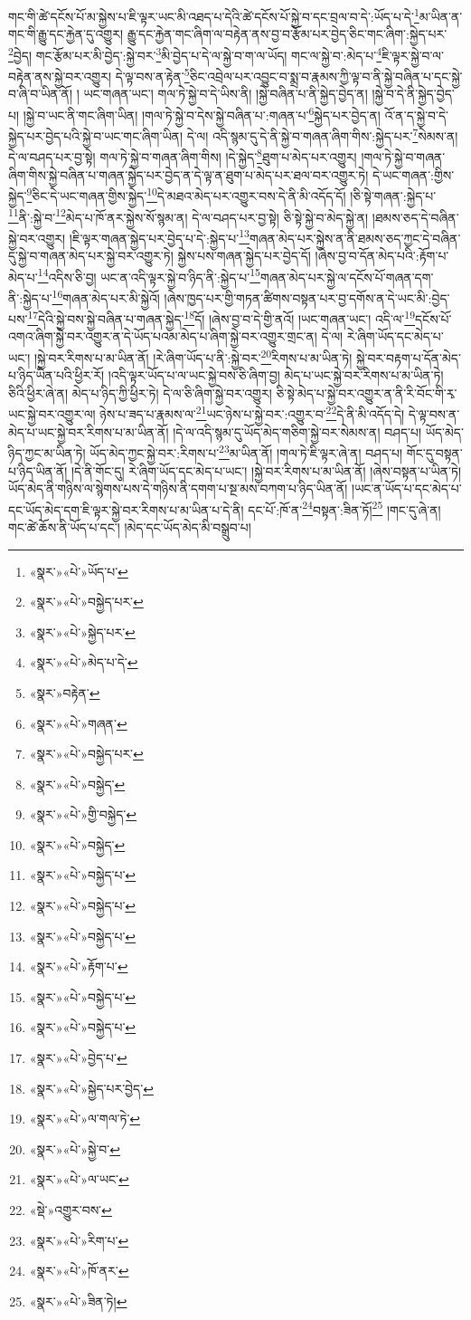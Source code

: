 གང་གི་ཚེ་དངོས་པོ་མ་སྐྱེས་པ་ཇི་ལྟར་ཡང་མི་འཐད་པ་དེའི་ཚེ་དངོས་པོ་སྐྱེ་བ་དང་བྲལ་བ་དེ་:ཡོད་པ་དེ་\footnote{«སྣར་»«པེ་»ཡོད་པ་}མ་ཡིན་ན་གང་གི་རྒྱུ་དང་རྐྱེན་དུ་འགྱུར། རྒྱུ་དང་རྐྱེན་གང་ཞིག་ལ་བརྟེན་ནས་བྱ་བ་རྩོམ་པར་བྱེད་ཅིང་གང་ཞིག་:སྐྱེད་པར་\footnote{«སྣར་»«པེ་»བསྐྱེད་པར་}བྱེད། གང་རྩོམ་པར་མི་བྱེད་:སྐྱེ་བར་\footnote{«སྣར་»«པེ་»སྐྱེད་པར་}མི་བྱེད་པ་དེ་ལ་སྐྱེ་བ་ག་ལ་ཡོད། གང་ལ་སྐྱེ་བ་:མེད་པ་\footnote{«སྣར་»«པེ་»མེད་པ་དེ་}ཇི་ལྟར་སྐྱེ་བ་ལ་བརྟེན་ནས་སྐྱེ་བར་འགྱུར། དེ་ལྟ་བས་ན་རྟེན་\footnote{«སྣར་»བརྟེན་}ཅིང་འབྲེལ་པར་འབྱུང་བ་སྨྲ་བ་རྣམས་ཀྱི་ལྟ་བ་ནི་སྐྱེ་བཞིན་པ་དང་སྐྱེ་བ་ཞི་བ་ཡིན་ནོ། །
ཡང་གཞན་ཡང་། གལ་ཏེ་སྐྱེ་བ་དེ་ཡིས་ནི། །སྐྱེ་བཞིན་པ་ནི་སྐྱེད་བྱེད་ན། །སྐྱེ་བ་དེ་ནི་སྐྱེད་བྱེད་པ། །སྐྱེ་བ་ཡང་ནི་གང་ཞིག་ཡིན། །གལ་ཏེ་སྐྱེ་བ་དེས་སྐྱེ་བཞིན་པ་:གཞན་པ་\footnote{«སྣར་»«པེ་»གཞན་}སྐྱེད་པར་བྱེད་ན། འོ་ན་ད་སྐྱེ་བ་དེ་སྐྱེད་པར་བྱེད་པའི་སྐྱེ་བ་ཡང་གང་ཞིག་ཡིན། དེ་ལ། འདི་སྙམ་དུ་དེ་ནི་སྐྱེ་བ་གཞན་ཞིག་གིས་:སྐྱེད་པར་\footnote{«སྣར་»«པེ་»བསྐྱེད་པར་}སེམས་ན། དེ་ལ་བཤད་པར་བྱ་སྟེ། གལ་ཏེ་སྐྱེ་བ་གཞན་ཞིག་གིས། །དེ་སྐྱེད་\footnote{«སྣར་»«པེ་»བསྐྱེད་}ཐུག་པ་མེད་པར་འགྱུར། །གལ་ཏེ་སྐྱེ་བ་གཞན་ཞིག་གིས་སྐྱེ་བཞིན་པ་གཞན་སྐྱེད་པར་བྱེད་ན་དེ་ལྟ་ན་ཐུག་པ་མེད་པར་ཐལ་བར་འགྱུར་ཏེ། དེ་ཡང་གཞན་:གྱིས་སྐྱེད་\footnote{«སྣར་»«པེ་»གྱི་བསྐྱེད་}ཅིང་དེ་ཡང་གཞན་གྱིས་སྐྱེད་\footnote{«སྣར་»«པེ་»བསྐྱེད་}དེ་མཐའ་མེད་པར་འགྱུར་བས་དེ་ནི་མི་འདོད་དོ། །ཅི་སྟེ་གཞན་:སྐྱེད་པ་\footnote{«སྣར་»«པེ་»བསྐྱེད་པ་}ནི་:སྐྱེ་བ་\footnote{«སྣར་»«པེ་»བསྐྱེད་པ་}མེད་པ་ཁོ་ནར་སྐྱེས་སོ་སྙམ་ན། དེ་ལ་བཤད་པར་བྱ་སྟེ། ཅི་སྟེ་སྐྱེ་བ་མེད་སྐྱེ་ན། །ཐམས་ཅད་དེ་བཞིན་སྐྱེ་བར་འགྱུར། །ཇི་ལྟར་གཞན་སྐྱེད་པར་བྱེད་པ་དེ་:སྐྱེད་པ་\footnote{«སྣར་»«པེ་»བསྐྱེད་པ་}གཞན་མེད་པར་སྐྱེས་ན་ནི་ཐམས་ཅད་ཀྱང་དེ་བཞིན་དུ་སྐྱེ་བ་གཞན་མེད་པར་སྐྱེ་བར་འགྱུར་ཏེ། སྐྱེས་པས་གཞན་སྐྱེད་པར་བྱེད་དོ། །ཞེས་བྱ་བ་དོན་མེད་པའི་:རྟོག་པ་མེད་པ་\footnote{«སྣར་»«པེ་»རྟོག་པ་}འདིས་ཅི་བྱ། ཡང་ན་འདི་ལྟར་སྐྱེ་བ་ཉིད་ནི་:སྐྱེད་པ་\footnote{«སྣར་»«པེ་»བསྐྱེད་པ་}གཞན་མེད་པར་སྐྱེ་ལ་དངོས་པོ་གཞན་དག་ནི་:སྐྱེད་པ་\footnote{«སྣར་»«པེ་»བསྐྱེད་པ་}གཞན་མེད་པར་མི་སྐྱེའོ། །ཞེས་ཁྱད་པར་གྱི་གཏན་ཚིགས་བསྟན་པར་བྱ་དགོས་ན་དེ་ཡང་མི་:བྱེད་པས་\footnote{«སྣར་»«པེ་»བྱེད་པ་}དེའི་སྐྱེ་བས་སྐྱེ་བཞིན་པ་གཞན་སྐྱེད་\footnote{«སྣར་»«པེ་»སྐྱེད་པར་བྱེད་}དོ། །ཞེས་བྱ་བ་དེ་གྱི་ནའོ། །ཡང་གཞན་ཡང་། འདི་ལ་\footnote{«སྣར་»«པེ་»ལ་གལ་ཏེ་}དངོས་པོ་འགའ་ཞིག་སྐྱེ་བར་འགྱུར་ན་དེ་ཡོད་པའམ་མེད་པ་ཞིག་སྐྱེ་བར་འགྱུར་གྲང་ན། དེ་ལ། རེ་ཞིག་ཡོད་དང་མེད་པ་ཡང་། །སྐྱེ་བར་རིགས་པ་མ་ཡིན་ནོ། །རེ་ཞིག་ཡོད་པ་ནི་:སྐྱེ་བར་\footnote{«སྣར་»«པེ་»སྐྱེ་བ་}རིགས་པ་མ་ཡིན་ཏེ། སྐྱེ་བར་བརྟག་པ་དོན་མེད་པ་ཉིད་ཡིན་པའི་ཕྱིར་རོ། །འདི་ལྟར་ཡོད་པ་ལ་ཡང་སྐྱེ་བས་ཅི་ཞིག་བྱ། མེད་པ་ཡང་སྐྱེ་བར་རིགས་པ་མ་ཡིན་ཏེ། ཅིའི་ཕྱིར་ཞེ་ན། མེད་པ་ཉིད་ཀྱི་ཕྱིར་ཏེ། དེ་ལ་ཅི་ཞིག་སྐྱེ་བར་འགྱུར། ཅི་སྟེ་མེད་པ་སྐྱེ་བར་འགྱུར་ན་ནི་རི་བོང་གི་རྭ་ཡང་སྐྱེ་བར་འགྱུར་ལ། ཉེས་པ་ཟད་པ་རྣམས་ལ་\footnote{«སྣར་»«པེ་»ལ་ཡང་}ཡང་ཉེས་པ་སྐྱེ་བར་:འགྱུར་བ་\footnote{«སྡེ་»འགྱུར་བས་}དེ་ནི་མི་འདོད་དེ། དེ་ལྟ་བས་ན་མེད་པ་ཡང་སྐྱེ་བར་རིགས་པ་མ་ཡིན་ནོ། །དེ་ལ་འདི་སྙམ་དུ་ཡོད་མེད་གཅིག་སྐྱེ་བར་སེམས་ན། བཤད་པ། ཡོད་མེད་ཉིད་ཀྱང་མ་ཡིན་ཏེ། ཡོད་མེད་ཀྱང་སྐྱེ་བར་:རིགས་པ་\footnote{«སྣར་»«པེ་»རིག་པ་}མ་ཡིན་ནོ། །གལ་ཏེ་ཇི་ལྟར་ཞེ་ན། བཤད་པ། གོང་དུ་བསྟན་པ་ཉིད་ཡིན་ནོ། །དེ་ནི་གོང་དུ། རེ་ཞིག་ཡོད་དང་མེད་པ་ཡང་། །སྐྱེ་བར་རིགས་པ་མ་ཡིན་ནོ། །ཞེས་བསྟན་པ་ཡིན་ཏེ། ཡོད་མེད་ནི་གཉིས་ལ་སྙེགས་པས་དེ་གཉིས་ནི་དགག་པ་སྔ་མས་བཀག་པ་ཉིད་ཡིན་ནོ། །ཡང་ན་ཡོད་པ་དང་མེད་པ་དང་ཡོད་མེད་དག་ཇི་ལྟར་སྐྱེ་བར་རིགས་པ་མ་ཡིན་པ་དེ་ནི། དང་པོ་:ཁོ་ན་\footnote{«སྣར་»«པེ་»ཁོ་ནར་}བསྟན་:ཟིན་ཏོ།\footnote{«སྣར་»«པེ་»ཟིན་ཏེ།} །གང་དུ་ཞེ་ན། གང་ཚེ་ཆོས་ནི་ཡོད་པ་དང་། །མེད་དང་ཡོད་མེད་མི་བསྒྲུབ་པ། 